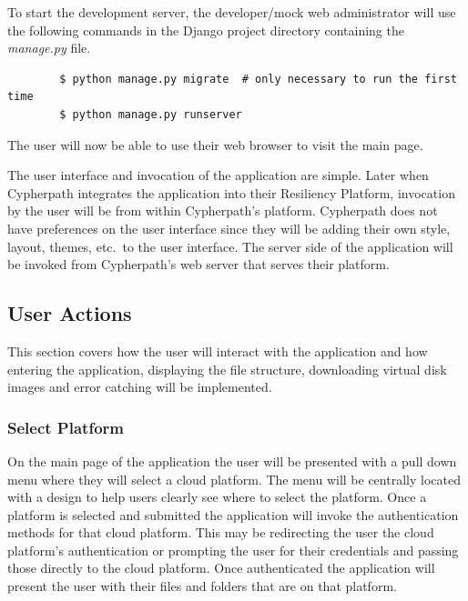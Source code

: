 \documentclass{article}
\begin{document}
        To start the development server, the developer/mock web administrator will use the following commands in the Django project directory containing the \textit{manage.py} file.
        \begin{verbatim}
        $ python manage.py migrate  # only necessary to run the first time
        $ python manage.py runserver
        \end{verbatim}

        The user will now be able to use their web browser to visit the main page.

        The user interface and invocation of the application are simple. Later when Cypherpath integrates the application into their Resiliency Platform, invocation by the user will be from within Cypherpath's
        platform. Cypherpath does not have preferences on the user interface since they will be adding their own style, layout, themes, etc.\ to the user interface. The server side of the application will be invoked
        from Cypherpath's web server that serves their platform.

        \subsection{User Actions}
        This section covers how the user will interact with the application and how entering the application, displaying the file structure, downloading virtual disk images and error catching 
        will be implemented.

            \subsubsection{Select Platform}
            On the main page of the application the user will be presented with a pull down menu where they will select a cloud platform. The menu will be centrally located with a design to
            help users clearly see where to select the platform. Once a platform is selected and submitted the application will invoke the authentication methods for that cloud platform. This may be redirecting the user
            the cloud platform's authentication or prompting the user for their credentials and passing those directly to the cloud platform.
            Once authenticated the application will present the user with their files and folders that are on that platform.
            
\end{document}
